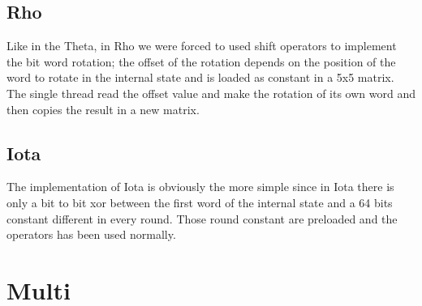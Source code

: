 \subsection{Rho}
Like in the Theta, in Rho we were forced to used shift operators to implement the bit word rotation; the offset of the rotation depends on the position of the word to rotate in the internal state and is loaded as constant in a 5x5 matrix. The single thread read the offset value and make the rotation of its own word and then copies the result in a new matrix.
\subsection{Iota}
The implementation of Iota is obviously the more simple since in Iota there is only a bit to bit xor between the first word of the internal state and a 64 bits constant different in every round. Those round constant are preloaded and the operators has been used normally.

\section{Multi}


